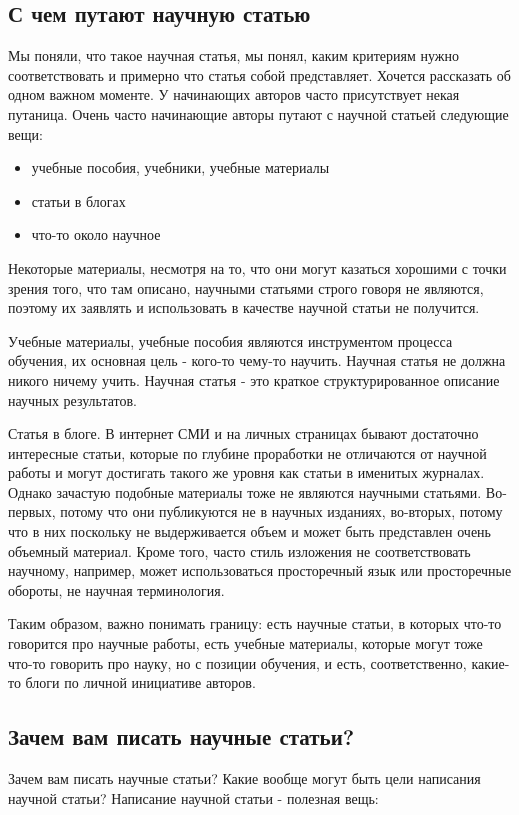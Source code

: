 \documentclass{report}
\begin{document}
\subsection{С чем путают научную статью}

Мы поняли, что такое научная статья, мы понял, каким критериям нужно соответствовать и примерно что статья собой представляет. Хочется рассказать об одном важном моменте. У начинающих авторов часто присутствует некая путаница. Очень часто начинающие авторы путают с научной статьей следующие вещи:

\begin{itemize}
\item учебные пособия, учебники, учебные материалы
\item статьи в блогах
\item что-то около научное
\end{itemize}

Некоторые материалы, несмотря на то, что они могут казаться хорошими с точки зрения того, что там описано, научными статьями строго говоря не являются, поэтому их заявлять и использовать в качестве научной статьи не получится.

Учебные материалы, учебные пособия являются инструментом процесса обучения, их основная цель - кого-то чему-то научить. Научная статья не должна никого ничему учить. Научная статья - это краткое структурированное описание научных результатов.

Статья в блоге. В интернет СМИ и на личных страницах бывают достаточно интересные статьи, которые по глубине проработки не отличаются от научной работы и могут достигать такого же уровня как статьи в именитых журналах. Однако зачастую подобные материалы тоже не являются научными статьями. Во-первых, потому что они публикуются не в научных изданиях, во-вторых, потому что в них поскольку не выдерживается объем и может быть представлен очень объемный материал. Кроме того, часто стиль изложения не соответствовать научному, например, может использоваться просторечный язык или просторечные обороты, не научная терминология.

Таким образом, важно понимать границу: есть научные статьи, в которых что-то говорится про научные работы, есть учебные материалы, которые могут тоже что-то говорить про науку, но с позиции обучения, и есть, соответственно, какие-то блоги по личной инициативе авторов.

\subsection{Зачем вам писать научные статьи? }
Зачем вам писать научные статьи? Какие вообще могут быть цели написания научной статьи? Написание научной статьи - полезная вещь:
\end{document}
